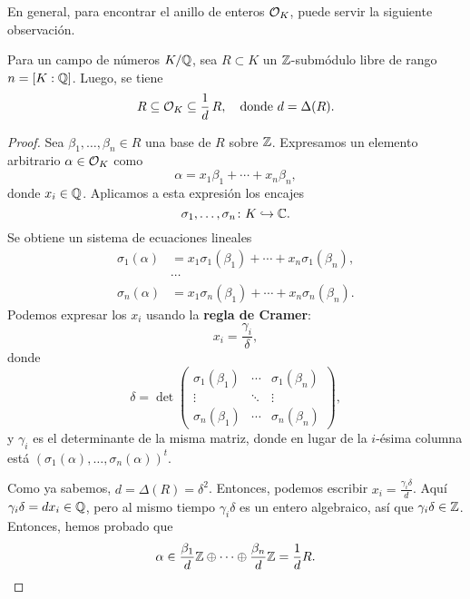 
En general, para encontrar el anillo de enteros $\mathcal{O}_K$, puede servir
la siguiente observación.

\begin{proposicion}
  \label{prop:OK-y-orden-no-maximal}
  Para un campo de números $K/\mathbb{Q}$, sea $R \subset K$ un $\mathbb{Z}$-submódulo libre
  de rango $n = [K : \mathbb{Q}]$. Luego, se tiene
  \[ R \subseteq \mathcal{O}_K \subseteq \frac{1}{d}\,R,
     \quad\text{donde }d = \Delta (R). \]

  \begin{proof}
    Sea $\beta_1, \ldots, \beta_n \in R$ una base de $R$ sobre $\mathbb{Z}$.
    Expresamos un elemento arbitrario $\alpha \in \mathcal{O}_K$ como
    $$\alpha = x_1 \beta_1 + \cdots + x_n \beta_n,$$
    donde $x_i \in \mathbb{Q}$. Aplicamos a esta expresión los encajes
    $$\sigma_1, \ldots, \sigma_n\colon K \hookrightarrow \mathbb{C}.$$
    Se obtiene un sistema de ecuaciones lineales
    \begin{align*}
      \sigma_1 (\alpha) & =
      x_1 \sigma_1 (\beta_1) + \cdots + x_n \sigma_1 (\beta_n), \\
      & \cdots \\
      \sigma_n (\alpha) & =
      x_1 \sigma_n (\beta_1) + \cdots + x_n \sigma_n (\beta_n).
    \end{align*}
    Podemos expresar los $x_i$ usando la \textbf{regla de Cramer}:
    $$x_i = \frac{\gamma_i}{\delta},$$
    donde
    \[ \delta = \det \begin{pmatrix}
      \sigma_1 (\beta_1) & \cdots & \sigma_1 (\beta_n) \\
      \vdots & \ddots & \vdots \\
      \sigma_n (\beta_1) & \cdots & \sigma_n (\beta_n)
    \end{pmatrix}, \]
    y $\gamma_i$ es el determinante de la misma matriz, donde en lugar de
    la $i$-ésima columna está
    $(\sigma_1 (\alpha), \ldots, \sigma_n (\alpha))^t$.

    Como ya sabemos, $d = \Delta (R) = \delta^2$. Entonces, podemos escribir
    $x_i = \frac{\gamma_i \delta}{d}$. Aquí $\gamma_i \delta = d x_i \in \mathbb{Q}$,
    pero al mismo tiempo $\gamma_i \delta$ es un entero algebraico, así que
    $\gamma_i \delta \in \mathbb{Z}$. Entonces, hemos probado que
    \[ \alpha \in
       \frac{\beta_1}{d}\mathbb{Z} \oplus \cdots \oplus \frac{\beta_n}{d}\mathbb{Z}
       = \frac{1}{d} R. \qedhere \]
  \end{proof}
\end{proposicion}

